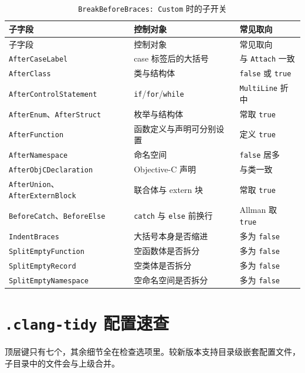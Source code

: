 \documentclass[12pt,a4paper,fontset=fandol]{ctexbook}
\newcommand{\Bk}{\discretionary{}{}{}}
\begin{document}
{\footnotesize
\begin{longtable}{@{}>{\raggedright\arraybackslash}p{}
                  >{\raggedright\arraybackslash}p{}
                  >{\raggedright\arraybackslash}p{}@{}}
\caption{\texttt{BreakBeforeBraces: Custom} 时的子开关}\label{tab:appA-brace}\\
\toprule
子字段 & 控制对象 & 常见取向 \\
\midrule
\endfirsthead
\toprule
子字段 & 控制对象 & 常见取向 \\
\midrule
\endhead
\bottomrule
\endlastfoot
\texttt{AfterCaseLabel} & case 标签后的大括号 & 与 \texttt{Attach} 一致 \\
\texttt{AfterClass} & 类与结构体 & \texttt{false} 或 \texttt{true} \\
\texttt{AfterControlStatement} & \texttt{if}/{\Bk}\texttt{for}/{\Bk}\texttt{while} & \texttt{MultiLine} 折中 \\
\texttt{AfterEnum}、\texttt{AfterStruct} & 枚举与结构体 & 常取 \texttt{true} \\
\texttt{AfterFunction} & 函数定义与声明可分别设置 & 定义 \texttt{true} \\
\texttt{AfterNamespace} & 命名空间 & \texttt{false} 居多 \\
\texttt{AfterObjCDeclaration} & Objective-C 声明 & 与类一致 \\
\texttt{AfterUnion}、\texttt{AfterExternBlock} & 联合体与 extern 块 & 常取 \texttt{true} \\
\texttt{BeforeCatch}、\texttt{BeforeElse} & \texttt{catch} 与 \texttt{else} 前换行 & Allman 取 \texttt{true} \\
\texttt{IndentBraces} & 大括号本身是否缩进 & 多为 \texttt{false} \\
\texttt{SplitEmptyFunction} & 空函数体是否拆分 & 多为 \texttt{false} \\
\texttt{SplitEmptyRecord} & 空类体是否拆分 & 多为 \texttt{false} \\
\texttt{SplitEmptyNamespace} & 空命名空间是否拆分 & 多为 \texttt{false} \\
\end{longtable}
}

\section{\texttt{.clang-tidy} 配置速查}\label{sec:appA-s3}

顶层键只有七个，其余细节全在检查选项里。较新版本支持目录级嵌套配置文件，子目录中的文件会与上级合并。
\end{document}

